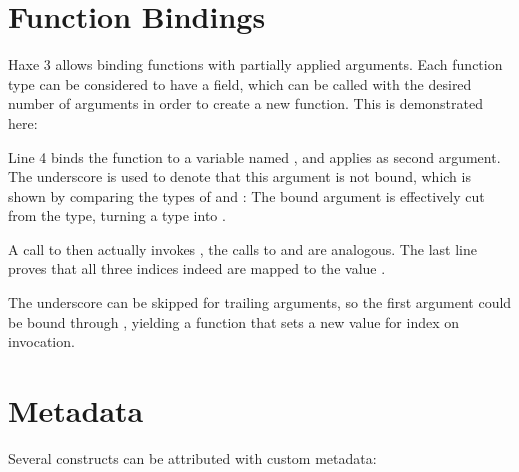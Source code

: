 \section{Function Bindings}
\label{lf-function-bindings}

Haxe 3 allows binding functions with partially applied arguments. Each function type can be considered to have a  field, which can be called with the desired number of arguments in order to create a new function. This is demonstrated here:

Line 4 binds the function  to a variable named , and applies  as second argument. The underscore \expr{_} is used to denote that this argument is not bound, which is shown by comparing the types of  and : The bound  argument is effectively cut from the type, turning a  type into .

A call to  then actually invokes , the calls to  and  are analogous. The last line proves that all three indices indeed are mapped to the value .

The underscore \expr{_} can be skipped for trailing arguments, so the first argument could be bound through , yielding a  function that sets a new value for index  on invocation.




\section{Metadata}
\label{lf-metadata}

Several constructs can be attributed with custom metadata:

